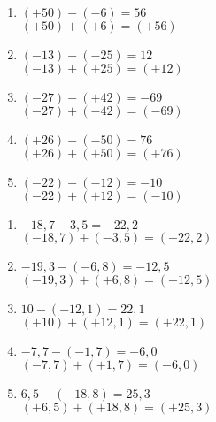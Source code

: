 \documentclass[11pt]{article}
\begin{document}
\newpage

\begin{multicols}{2}

\begin{exercicedevoir}[5][Calculer]
\begin{enumerate}[itemsep=1em]
\item $(+50) - (-6)=56$ \\ $(+50) + (+6) = (+56)$
\item $(-13) - (-25)=12$ \\ $(-13) + (+25) = (+12)$
\item $(-27) - (+42)=-69$ \\ $(-27) + (-42) = (-69)$
\item $(+26) - (-50)=76$ \\ $(+26) + (+50) = (+76)$
\item $(-22) - (-12)=-10$ \\ $(-22) + (+12) = (-10)$
\end{enumerate}
\end{exercicedevoir}

\begin{exercicedevoir}[5][Calculer]
\begin{enumerate}[itemsep=1em]
\item $-18{,}7 - 3{,}5=-22{,}2$ \\ $(-18{,}7) + (-3{,}5) = (-22{,}2)$
\item $-19{,}3 - (-6{,}8)=-12{,}5$ \\ $(-19{,}3) + (+6{,}8) = (-12{,}5)$
\item $10 - (-12{,}1)=22{,}1$ \\ $(+10) + (+12{,}1) = (+22{,}1)$
\item $-7{,}7 - (-1{,}7)=-6{,}0$ \\ $(-7{,}7) + (+1{,}7) = (-6{,}0)$
\item $6{,}5 - (-18{,}8)=25{,}3$ \\ $(+6{,}5) + (+18{,}8) = (+25{,}3)$
\end{enumerate}
\end{exercicedevoir}
\end{multicols}
\end{document}

